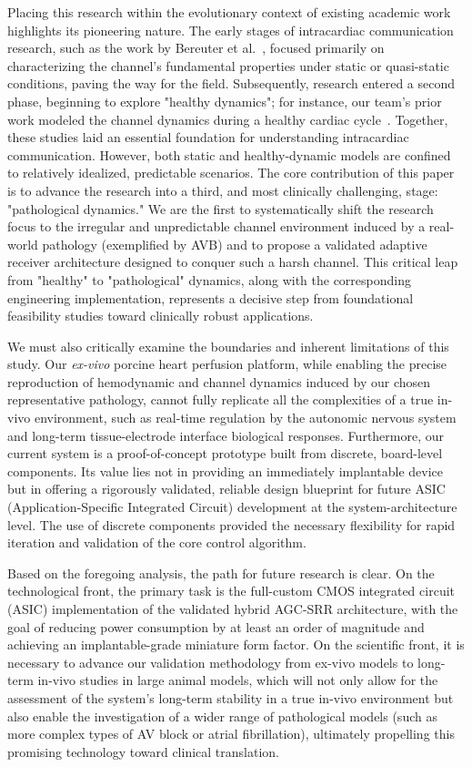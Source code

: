 \documentclass[journal]{IEEEtran}
\begin{document}
Placing this research within the evolutionary context of existing academic work highlights its pioneering nature. The early stages of intracardiac communication research, such as the work by Bereuter et al.~\cite{bereuter2019leadless_sync}, focused primarily on characterizing the channel's fundamental properties under static or quasi-static conditions, paving the way for the field. Subsequently, research entered a second phase, beginning to explore "healthy dynamics"; for instance, our team's prior work modeled the channel dynamics during a healthy cardiac cycle~\cite{wei2024time}. Together, these studies laid an essential foundation for understanding intracardiac communication. However, both static and healthy-dynamic models are confined to relatively idealized, predictable scenarios. The core contribution of this paper is to advance the research into a third, and most clinically challenging, stage: "pathological dynamics." We are the first to systematically shift the research focus to the irregular and unpredictable channel environment induced by a real-world pathology (exemplified by AVB) and to propose a validated adaptive receiver architecture designed to conquer such a harsh channel. This critical leap from "healthy" to "pathological" dynamics, along with the corresponding engineering implementation, represents a decisive step from foundational feasibility studies toward clinically robust applications.

We must also critically examine the boundaries and inherent limitations of this study. Our \textit{ex-vivo} porcine heart perfusion platform, while enabling the precise reproduction of hemodynamic and channel dynamics induced by our chosen representative pathology, cannot fully replicate all the complexities of a true in-vivo environment, such as real-time regulation by the autonomic nervous system and long-term tissue-electrode interface biological responses. Furthermore, our current system is a proof-of-concept prototype built from discrete, board-level components. Its value lies not in providing an immediately implantable device but in offering a rigorously validated, reliable design blueprint for future ASIC (Application-Specific Integrated Circuit) development at the system-architecture level. The use of discrete components provided the necessary flexibility for rapid iteration and validation of the core control algorithm.


Based on the foregoing analysis, the path for future research is clear. On the technological front, the primary task is the full-custom CMOS integrated circuit (ASIC) implementation of the validated hybrid AGC-SRR architecture, with the goal of reducing power consumption by at least an order of magnitude and achieving an implantable-grade miniature form factor. On the scientific front, it is necessary to advance our validation methodology from ex-vivo models to long-term in-vivo studies in large animal models, which will not only allow for the assessment of the system's long-term stability in a true in-vivo environment but also enable the investigation of a wider range of pathological models (such as more complex types of AV block or atrial fibrillation), ultimately propelling this promising technology toward clinical translation.
\end{document}
